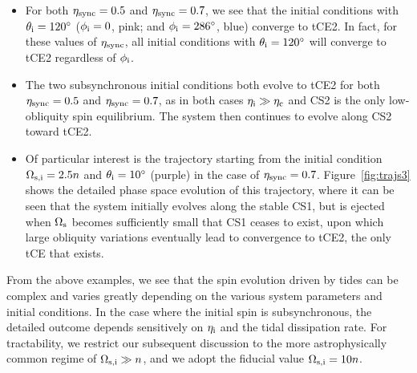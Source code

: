 \documentclass[
        fleqn,
        usenatbib,
        referee
    ]{mnras}
\begin{document}
\begin{itemize}
    \item For both $\eta_{\rm sync} = 0.5$ and $\eta_{\rm sync} = 0.7$, we see
        that the initial conditions with $\theta_{\rm i} = 120^\circ$
        ($\phi_{\rm i} = 0$, pink; and $\phi_{\rm i} = 286^\circ$, blue)
        converge to tCE2. In fact, for these values of $\eta_{\rm sync}$, all
        initial conditions with $\theta_{\rm i} = 120^\circ$ will converge to
        tCE2 regardless of $\phi_{\rm i}$.

    \item The two subsynchronous initial conditions both evolve to tCE2 for both
        $\eta_{\rm sync} = 0.5$ and $\eta_{\rm sync} = 0.7$, as in both cases
        $\eta_{\rm i} \gg \eta_{\rm c}$ and CS2 is the only low-obliquity spin
        equilibrium. The system then continues to evolve along CS2 toward tCE2.

    \item Of particular interest is the trajectory starting from the initial
        condition $\Omega_{\rm s, i} = 2.5n$ and $\theta_{\rm i} = 10^\circ$
        (purple) in the case of $\eta_{\rm sync} = 0.7$. Figure~\ref{fig:trajs3}
        shows the detailed phase space evolution of this trajectory, where it
        can be seen that the system initially evolves along the stable CS1, but
        is ejected when $\Omega_{\rm s}$ becomes sufficiently small that CS1 ceases
        to exist, upon which large obliquity variations eventually lead to
        convergence to tCE2, the only tCE that exists.
\end{itemize}
From the above examples, we see that the spin evolution driven by tides can be
complex and varies greatly depending on the various system parameters and
initial conditions. In the case where the initial spin is subsynchronous, the
detailed outcome depends sensitively on $\eta_{\rm i}$ and the tidal dissipation
rate. For tractability, we restrict our subsequent discussion to the more
astrophysically common regime of $\Omega_{\rm s, i} \gg n$, and we adopt the
fiducial value $\Omega_{\rm s, i} = 10n$.
\end{document}
